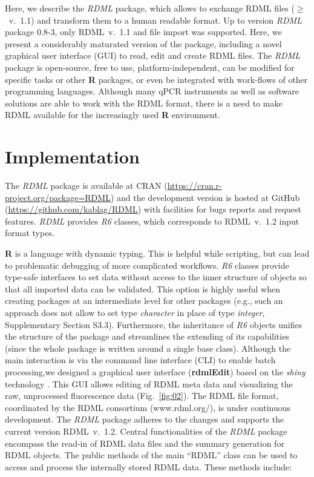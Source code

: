 \documentclass{bioinfo}
\begin{document}
Here, we describe the \textit{RDML} package, which 
allows to exchange RDML files ($\geq$~v.~1.1) and transform them to  a human 
readable format.  Up to version \textit{RDML} package 0.8-3, only RDML~v.~1.1 and 
file import was supported. Here, we present a considerably maturated version of 
the package, including a novel graphical user interface (GUI) to read, edit and create RDML files. The \textit{RDML} package is open-source, free to use, 
platform-independent, can be modified for specific tasks or other 
\textbf{R} packages, or even be integrated  with work-flows  of other programming 
languages.  Although many qPCR instruments as well as software solutions are able 
to work with the RDML format, there is a need to make RDML available for the increasingly 
used \textbf{R} environment.

\section{Implementation}
The \textit{RDML} package is available at CRAN 
(\url{https://cran.r-project.org/package=RDML}) and the 
development version is hosted at GitHub (\url{https://github.com/kablag/RDML}) 
with facilities for bugs reports and request features. \textit{RDML} provides 
\emph{R6} classes, which corresponds to RDML~v.~1.2 input format types. 



\textbf{R} 
is a language with dynamic typing. This is helpful while scripting, but can lead 
to problematic debugging of more complicated workflows. \emph{R6} classes 
provide type-safe interfaces to set data without access to the inner structure of 
objects so that all imported data can be validated. This option is  highly useful when 
creating packages  at an intermediate level for other packages (e.g., such an
approach does not allow to set type \emph{character} in place of type \emph{integer}, 
Supplementary Section S3.3). Furthermore, the inheritance of \emph{R6} objects 
unifies the structure of the package and streamlines the extending of its capabilities 
(since the whole package is written around a single base class). Although the main interaction 
is via the command line interface (CLI) to enable batch processing,we designed  a graphical user
interface (\textbf{rdmlEdit}) based on the \textit{shiny} technology  \cite{shiny_2016}. This GUI allows editing  of RDML meta data and  visualizing the raw, unprocessed fluorescence data
(Fig.~\ref{fig:02}). The RDML file format, coordinated by the RDML consortium (www.rdml.org/), is under continuous development. The \textit{RDML} 
package  adheres to the changes and supports the current version RDML~v.~1.2. 
Central functionalities of the \textit{RDML} package encompass the read-in of RDML  
data files and the summary generation for RDML objects. The public methods of the main  “RDML” class can be used 
to access and process the internally stored RDML data. These methods include:
\end{document}
